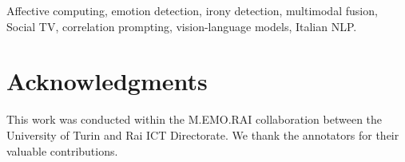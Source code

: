 \documentclass[letterpaper,journal]{IEEEtran}
\begin{document}
\begin{IEEEkeywords}
Affective computing, emotion detection, irony detection, multimodal fusion, Social TV, correlation prompting, vision-language models, Italian NLP.
\end{IEEEkeywords}








\section*{Acknowledgments}
This work was conducted within the M.EMO.RAI collaboration between the University of Turin and Rai ICT Directorate. We thank the annotators for their valuable contributions.


\end{document}
